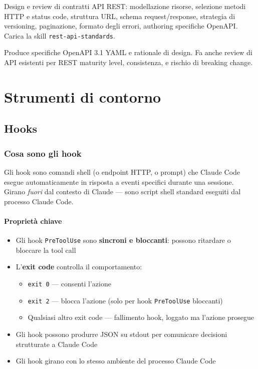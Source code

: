\documentclass[12pt,a4paper,twoside]{book}
\begin{document}
Design e review di contratti API REST: modellazione risorse, selezione metodi HTTP e status code, struttura URL, schema request/response, strategia di versioning, paginazione, formato degli errori, authoring specifiche OpenAPI. Carica la skill \texttt{rest-api-standards}.

Produce specifiche OpenAPI 3.1 YAML e rationale di design. Fa anche review di API esistenti per REST maturity level, consistenza, e rischio di breaking change.

\part{Strumenti di contorno}

\chapter{Hooks}

\section{Cosa sono gli hook}

Gli hook sono comandi shell (o endpoint HTTP, o prompt) che Claude Code esegue automaticamente in risposta a eventi specifici durante una sessione. Girano \textit{fuori} dal contesto di Claude — sono script shell standard eseguiti dal processo Claude Code.

\subsection{Proprietà chiave}

\begin{itemize}
  \item Gli hook \texttt{PreToolUse} sono \textbf{sincroni e bloccanti}: possono ritardare o bloccare la tool call
  \item L'\textbf{exit code} controlla il comportamento:
    \begin{itemize}
      \item \texttt{exit 0} — consenti l'azione
      \item \texttt{exit 2} — blocca l'azione (solo per hook \texttt{PreToolUse} bloccanti)
      \item Qualsiasi altro exit code — fallimento hook, loggato ma l'azione prosegue
    \end{itemize}
  \item Gli hook possono produrre JSON su stdout per comunicare decisioni strutturate a Claude Code
  \item Gli hook girano con lo stesso ambiente del processo Claude Code
\end{itemize}
\end{document}

